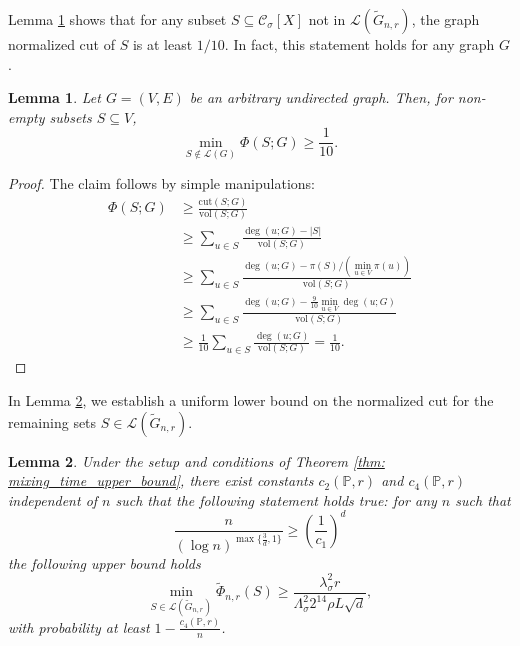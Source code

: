\documentclass[11pt,twoside]{article}
\newtheorem{lemma}{Lemma}
\newcommand{\vol}{\mathrm{vol}}
\newcommand{\cut}{\mathrm{cut}}
\newcommand{\abs}[1]{\left \lvert #1 \right \rvert}
\newcommand{\1}{\mathbf{1}}
\newcommand{\Xbf}{X}             %
\newcommand{\Pbb}{\mathbb{P}}
\newcommand{\Cset}{\mathcal{C}}
\newcommand{\Csig}{\Cset_{\sigma}}
\begin{document}
Lemma \ref{lem: graph_conductance_profile_lb_1} shows that for any subset $S \subseteq \Csig[\Xbf]$ not in $\mathcal{L}(\widetilde{G}_{n,r})$, the graph normalized cut of $S$ is at least $1/10$. In fact, this statement holds for any graph $G$.
\begin{lemma}
	\label{lem: graph_conductance_profile_lb_1}
	Let $G = (V,E)$ be an arbitrary undirected graph. Then, for non-empty subsets $S \subseteq V$, 
	\begin{equation*}
	\min_{S \not\in \mathcal{L}(G)}\Phi(S; G) \geq \frac{1}{10}.
	\end{equation*}
\end{lemma}
\begin{proof}
	The claim follows by simple manipulations:
	\begin{align*}
	\Phi(S;G) & \geq \frac{\cut(S;G)}{\vol(S;G)} \\
	& \geq \sum_{u \in S} \frac{\deg(u;G) - \abs{S}}{\vol(S;G)} \\
	& \geq \sum_{u \in S} \frac{\deg(u;G) - \pi(S)/(\min_{u \in V}\pi(u))}{\vol(S;G)} \\
	& \geq \sum_{u \in S} \frac{\deg(u;G) - \frac{9}{10} \min_{u \in V}\deg(u;G)}{\vol(S;G)} \\
	& \geq \frac{1}{10} \sum_{u \in S} \frac{\deg(u;G)}{\vol(S;G)} = \frac{1}{10}.
	\end{align*}
\end{proof}

In Lemma \ref{lem: graph_conductance_profile_lb}, we establish a uniform lower bound on the normalized cut for the remaining sets $S \in \mathcal{L}(\widetilde{G}_{n,r})$. 

\begin{lemma}
	\label{lem: graph_conductance_profile_lb}
	Under the setup and conditions of Theorem \ref{thm: mixing_time_upper_bound}, there exist constants $c_2(\Pbb,r)$ and $c_4(\Pbb,r)$ independent of $n$ such that the following statement holds true: for any $n$ such that
	\begin{equation*}
	\frac{n}{(\log n)^{\max\{\frac{3}{d},1\}}} \geq \left(\frac{1}{c_1}\right)^d
	\end{equation*}
	the following upper bound holds
	\begin{equation}
	\label{eqn: graph_conductance_profile_lb}
	\min_{S \in \mathcal{L}(\widetilde{G}_{n,r})} \widetilde{\Phi}_{n,r}(S) \geq \frac{\lambda_{\sigma}^2 r}{\Lambda_{\sigma}^2 2^{14} \rho L \sqrt{d}},
	\end{equation}
	with probability at least $1 - \frac{c_4(\Pbb,r)}{n}$. 
\end{lemma}
\end{document}
